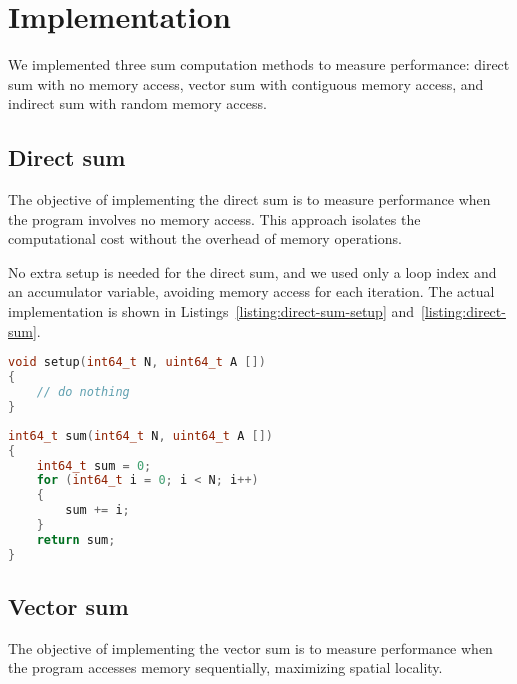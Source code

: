 
\section{Implementation}
\label{sec:implementation}
We implemented three sum computation methods to measure performance: direct sum with no memory access, vector sum with contiguous memory access,
and indirect sum with random memory access.

\subsection{Direct sum}
\label{subsec:implementation-direct-sum}
The objective of implementing the direct sum is to measure performance when the program involves no memory access. This approach isolates the computational cost without the overhead of memory operations.

No extra setup is needed for the direct sum, and we used only a loop index and an accumulator variable, avoiding memory access for each iteration. The actual implementation is shown in Listings~\ref{listing:direct-sum-setup} and~\ref{listing:direct-sum}.


\begin{lstlisting}[caption={Direct Sum Setup: No setup required.},label={listing:direct-sum-setup}, name=direct-sum-setup, float=htbp, style=mystyle,language=C++]
void setup(int64_t N, uint64_t A [])
{
    // do nothing
}
\end{lstlisting}

\begin{lstlisting}[caption={Direct Sum: Computes the sum by directly adding the loop index values.},label={listing:direct-sum}, name=direct-sum, float=htbp, style=mystyle,language=C++]
int64_t sum(int64_t N, uint64_t A [])
{
    int64_t sum = 0;
    for (int64_t i = 0; i < N; i++)
    {
        sum += i;
    }
    return sum;
}
\end{lstlisting}

\FloatBarrier
\subsection{Vector sum}
\label{subsec:implementation-vector-sum}
The objective of implementing the vector sum is to measure performance when the program accesses memory sequentially, maximizing spatial locality.

